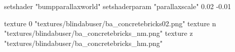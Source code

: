 	setshader "bumpparallaxworld"
	setshaderparam "parallaxscale" 0.02 -0.01

		texture 0 "textures/blindabuser/ba_concretebricks02.png"
		texture n "textures/blindabuser/ba_concretebricks_nm.png"
		texture z "textures/blindabuser/ba_concretebricks_hm.png"
